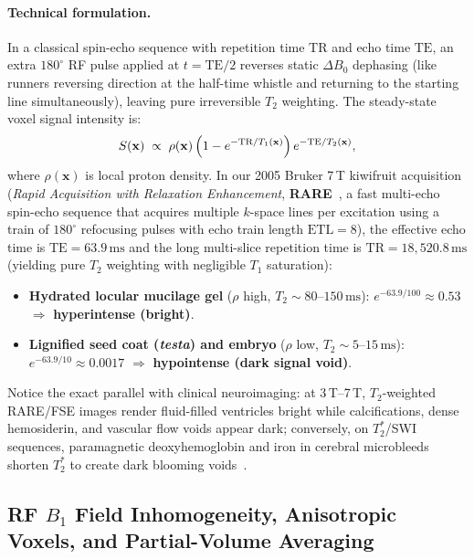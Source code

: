\documentclass[10pt,a4paper]{article}
\renewcommand{\_}{\origunderscore\allowbreak}
\begin{document}
\paragraph{Technical formulation.} In a classical spin-echo sequence with repetition time $\text{TR}$ and echo time $\text{TE}$, an extra $180^\circ$ RF pulse applied at $t = \text{TE}/2$ reverses static $\Delta B_0$ dephasing (like runners reversing direction at the half-time whistle and returning to the starting line simultaneously), leaving pure irreversible $T_2$ weighting. The steady-state voxel signal intensity is:
\begin{equation}
    S(\mathbf{x}) \;\propto\; \rho(\mathbf{x})\,\Bigl(1 - e^{-\text{TR}/T_1(\mathbf{x})}\Bigr)\,e^{-\text{TE}/T_2(\mathbf{x})},
    \label{eq:spin_echo}
\end{equation}
where $\rho(\mathbf{x})$ is local proton density. In our 2005 Bruker 7\,T kiwifruit acquisition (\emph{Rapid Acquisition with Relaxation Enhancement}, \textbf{RARE}~\cite{hennig1986rare}, a fast multi-echo spin-echo sequence that acquires multiple $k$-space lines per excitation using a train of $180^\circ$ refocusing pulses with echo train length $\text{ETL} = 8$), the effective echo time is $\text{TE} = 63.9\,\text{ms}$ and the long multi-slice repetition time is $\text{TR} = 18{,}520.8\,\text{ms}$ (yielding pure $T_2$ weighting with negligible $T_1$ saturation):
\begin{itemize}
    \item \textbf{Hydrated locular mucilage gel} ($\rho$ high, $T_2 \sim 80\text{--}150\,\text{ms}$): $e^{-63.9/100} \approx 0.53$ $\Rightarrow$ \textbf{hyperintense (bright)}.
    \item \textbf{Lignified seed coat (\textit{testa}) and embryo} ($\rho$ low, $T_2 \sim 5\text{--}15\,\text{ms}$): $e^{-63.9/10} \approx 0.0017$ $\Rightarrow$ \textbf{hypointense (dark signal void)}.
\end{itemize}
Notice the exact parallel with clinical neuroimaging: at 3\,T--7\,T, $T_2$-weighted RARE/FSE images render fluid-filled ventricles bright while calcifications, dense hemosiderin, and vascular flow voids appear dark; conversely, on $T_2^*$/SWI sequences, paramagnetic deoxyhemoglobin and iron in cerebral microbleeds shorten $T_2^*$ to create dark blooming voids~\cite{greenberg2009cmb}.

\subsection{RF $B_1$ Field Inhomogeneity, Anisotropic Voxels, and Partial-Volume Averaging}
\end{document}
